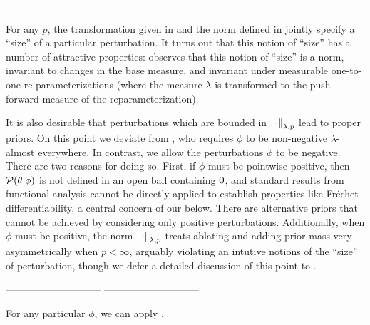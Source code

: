 -----------------------------
-----------------------------


For any $p$, the transformation given in  and the norm
defined in  jointly specify a ``size'' of a particular
perturbation.   It turns out that this notion of ``size'' has a number of
attractive properties: \citep[Result 2]{gustafson:1996:local} observes that this
notion of ``size'' is a norm, invariant to changes in the base measure, and
invariant under measurable one-to-one re-parameterizations (where the measure
$\lambda$ is transformed to the push-forward measure of the reparameterization).


It is also desirable that perturbations which are bounded in
$\left\Vert\cdot\right\Vert_{\lambda,p}$ lead to proper priors.  On this point we deviate from
\citep{gustafson:1996:local}, who requires $\phi$ to be non-negative
$\lambda$-almost everywhere.  In contrast, we allow the perturbations $\phi$ to
be negative. There are two reasons for doing so.  First, if $\phi$ must be
pointwise positive, then $\mathcal{P}(\theta \vert \phi)$ is not defined in an open ball
containing $0$, and standard results from functional analysis cannot be
directly applied to establish properties like Fr{\'e}chet differentiability, a
central concern of our  below.  There are alternative
priors that cannot be achieved by considering only positive perturbations.
Additionally, when $\phi$ must be positive, the norm $\left\Vert\cdot\right\Vert_{\lambda, p}$
treats ablating and adding prior mass very asymmetrically when $p < \infty$,
arguably violating an intutive notions of the ``size'' of perturbation, though
we defer a detailed discussion of this point to .


-----------------------------
-----------------------------

For any particular $\phi$, we can apply .
%

